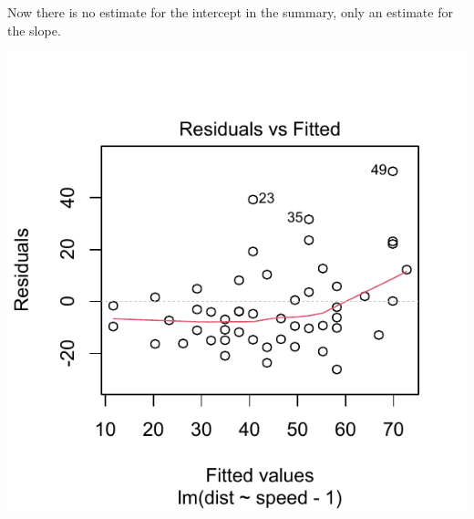 \documentclass[krantz2]{krantz}\usepackage{knitr}
\begin{document}
Now there is no estimate for the intercept in the summary, only an estimate for the slope.

\begin{knitrout}\footnotesize
{}\color{fgcolor}\begin{kframe}
\begin{alltt}
  \hlstd{=} \hlstd{)}
\end{alltt}
\end{kframe}

{\centering \includegraphics[width=.54\textwidth]{figure/pos-models-2a-1} 

}



\end{knitrout}
\end{document}
